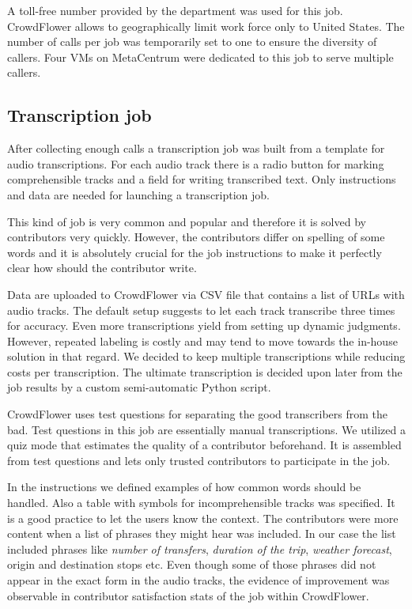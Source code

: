 A toll-free number provided by the department was used for this job.
CrowdFlower allows to geographically limit work force only to United States.
The number of calls per job was temporarily set to one to ensure the diversity of callers.
Four \acp{VM} on MetaCentrum were dedicated to this job to serve multiple callers.

\subsection{Transcription job}

After collecting enough calls a transcription job was built from a template for audio transcriptions.
For each audio track there is a radio button for marking comprehensible tracks and a field for writing transcribed text.
Only instructions and data are needed for launching a transcription job.

This kind of job is very common and popular and therefore it is solved by contributors very quickly.
However, the contributors differ on spelling of some words and it is absolutely crucial for the job instructions to make it perfectly clear how should the contributor write.

Data are uploaded to CrowdFlower via \acf{CSV} file that contains a list of URLs with audio tracks.
The default setup suggests to let each track transcribe three times for accuracy.
Even more transcriptions yield from setting up dynamic judgments.
However, repeated labeling is costly and may tend to move towards the in-house solution in that regard. %
We decided to keep multiple transcriptions while reducing costs per transcription.
The ultimate transcription is decided upon later from the job results by a custom semi-automatic Python script.

CrowdFlower uses test questions for separating the good transcribers from the bad.
Test questions in this job are essentially manual transcriptions.
We utilized a quiz mode that estimates the quality of a contributor beforehand.
It is assembled from test questions and lets only trusted contributors to participate in the job.

In the instructions we defined examples of how common words should be handled.
Also a table with symbols for incomprehensible tracks was specified.
It is a good practice to let the users know the context.
The contributors were more content when a list of phrases they might hear was included.%
In our case the list included phrases like \textit{number of transfers}, \textit{duration of the trip}, \textit{weather forecast}, origin and destination stops etc.
Even though some of those phrases did not appear in the exact form in the audio tracks, the evidence of improvement was observable in contributor satisfaction stats of the job within CrowdFlower.


